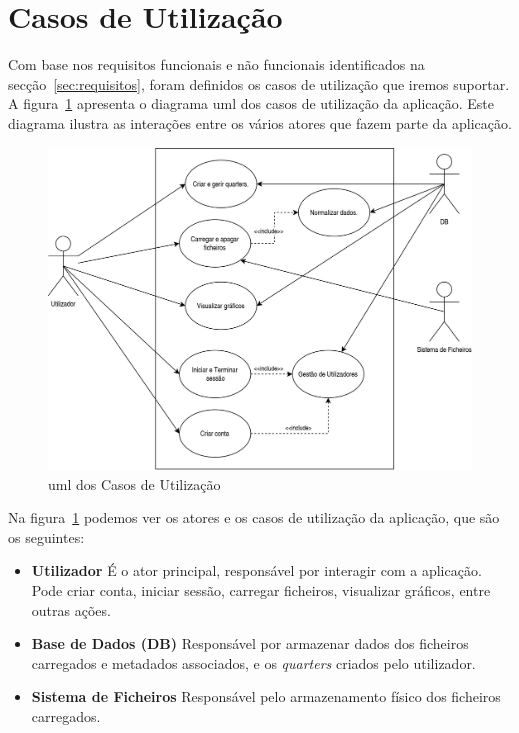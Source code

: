 \section{Casos de Utilização}
\label{ch:casosUtilizacao}

Com base nos requisitos funcionais e não funcionais identificados na secção~\ref{sec:requisitos}, foram definidos os casos de utilização que iremos suportar. A figura~\ref{fig:umlCasosUtilizacao} apresenta o diagrama \gls{uml} dos casos de utilização da aplicação. Este diagrama ilustra as interações entre os vários atores que fazem parte da aplicação.

\begin{figure}[h]
\centering
\includegraphics[max width=12cm]{./img/usecase_uml}
\caption{\gls{uml} dos Casos de Utilização}
\label{fig:umlCasosUtilizacao}
\end{figure}

Na figura~\ref{fig:umlCasosUtilizacao} podemos ver os atores e os casos de utilização da aplicação, que são os seguintes:
\begin{itemize}
    \item \textbf{Utilizador} É o ator principal, responsável por interagir com a aplicação. Pode criar conta, iniciar sessão, carregar ficheiros, visualizar gráficos, entre outras ações.
    \item \textbf{Base de Dados (DB)} Responsável por armazenar dados dos ficheiros carregados e metadados associados, e os \textit{quarters} criados pelo utilizador.
    \item \textbf{Sistema de Ficheiros} Responsável pelo armazenamento físico dos ficheiros carregados.
\end{itemize}


